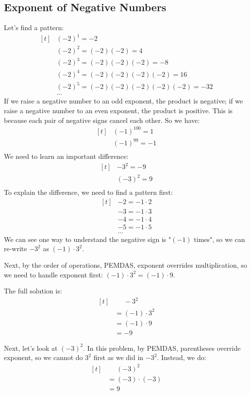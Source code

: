 \subsection{Exponent of Negative Numbers}
Let's find a pattern:
\[
\begin{aligned}[t]
	&(-2)^{1}=-2 \\
	&(-2)^{2}=(-2)(-2)=4 \\
	&(-2)^{3}=(-2)(-2)(-2)=-8 \\
	&(-2)^{4}=(-2)(-2)(-2)(-2)=16 \\
	&(-2)^{5}=(-2)(-2)(-2)(-2)(-2)=-32 \\
	&...
\end{aligned}
\]
If we raise a negative number to an odd exponent, the product is negative; if we raise a negative number to an even exponent, the product is positive. This is because each pair of negative signs cancel each other. So we have:
\[
\begin{aligned}[t]
	&(-1)^{100}=1 \\
	&(-1)^{99}=-1 \\
\end{aligned}
\]
We need to learn an important difference:
\[
\begin{aligned}[t]
	&-3^{2}=-9 \\
	&(-3)^{2}=9 \\
\end{aligned}
\]
To explain the difference, we need to find a pattern first:
\[
\begin{aligned}[t]
	&-2=-1\cdot2 \\
	&-3=-1\cdot3 \\
	&-4=-1\cdot4 \\
	&-5=-1\cdot5 \\
	&...
\end{aligned}
\]
We can see one way to understand the negative sign is "$(-1)$ times", so we can re-write $-3^{2}$ as $(-1)\cdot3^{2}$.

Next, by the order of operations, PEMDAS, exponent overrides multiplication, so we need to handle exponent first: $(-1)\cdot3^{2}=(-1)\cdot9$.

The full solution is:
\[
\begin{aligned}[t]
	&\phantom{{}=}-3^{2} \\
	&=(-1)\cdot3^{2} \\
	&=(-1)\cdot9 \\
	&=-9
\end{aligned}
\]

Next, let's look at $(-3)^{2}$. In this problem, by PEMDAS, parentheses override exponent, so we cannot do $3^{2}$ first as we did in $-3^{2}$. Instead, we do:
\[
\begin{aligned}[t]
	&\phantom{{}=}(-3)^{2} \\
	&=(-3)\cdot(-3) \\
	&=9
\end{aligned}
\]


